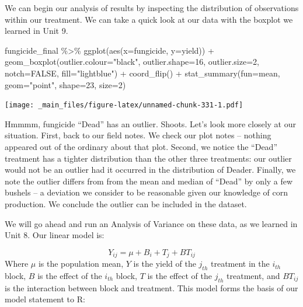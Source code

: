\documentclass[
]{book}
\newenvironment{Shaded}{\begin{snugshade}}{\end{snugshade}}
\newcommand{\AttributeTok}[1]{\textcolor[rgb]{0.77,0.63,0.00}{#1}}
\newcommand{\ConstantTok}[1]{\textcolor[rgb]{0.00,0.00,0.00}{#1}}
\newcommand{\DecValTok}[1]{\textcolor[rgb]{0.00,0.00,0.81}{#1}}
\newcommand{\FunctionTok}[1]{\textcolor[rgb]{0.00,0.00,0.00}{#1}}
\newcommand{\NormalTok}[1]{#1}
\newcommand{\SpecialCharTok}[1]{\textcolor[rgb]{0.00,0.00,0.00}{#1}}
\newcommand{\StringTok}[1]{\textcolor[rgb]{0.31,0.60,0.02}{#1}}
\begin{document}
We can begin our analysis of results by inspecting the distribution of observations within our treatment. We can take a quick look at our data with the boxplot we learned in Unit 9.

\begin{Shaded}
\begin{Highlighting}[]
\NormalTok{fungicide\_final }\SpecialCharTok{\%\textgreater{}\%}
        \FunctionTok{ggplot}\NormalTok{(}\FunctionTok{aes}\NormalTok{(}\AttributeTok{x=}\NormalTok{fungicide, }\AttributeTok{y=}\NormalTok{yield)) }\SpecialCharTok{+} 
        \FunctionTok{geom\_boxplot}\NormalTok{(}\AttributeTok{outlier.colour=}\StringTok{"black"}\NormalTok{, }\AttributeTok{outlier.shape=}\DecValTok{16}\NormalTok{,}
             \AttributeTok{outlier.size=}\DecValTok{2}\NormalTok{, }\AttributeTok{notch=}\ConstantTok{FALSE}\NormalTok{, }\AttributeTok{fill=}\StringTok{"lightblue"}\NormalTok{) }\SpecialCharTok{+}
        \FunctionTok{coord\_flip}\NormalTok{() }\SpecialCharTok{+}
        \FunctionTok{stat\_summary}\NormalTok{(}\AttributeTok{fun=}\NormalTok{mean, }\AttributeTok{geom=}\StringTok{"point"}\NormalTok{, }\AttributeTok{shape=}\DecValTok{23}\NormalTok{, }\AttributeTok{size=}\DecValTok{2}\NormalTok{)}
\end{Highlighting}
\end{Shaded}

\texttt{[image: \_main\_files/figure-latex/unnamed-chunk-331-1.pdf]}

Hmmmm, fungicide ``Dead'' has an outlier. Shoots. Let's look more closely at our situation. First, back to our field notes. We check our plot notes -- nothing appeared out of the ordinary about that plot. Second, we notice the ``Dead'' treatment has a tighter distribution than the other three treatments: our outlier would not be an outlier had it occurred in the distribution of Deader. Finally, we note the outlier differs from from the mean and median of ``Dead'' by only a few bushels -- a deviation we consider to be reasonable given our knowledge of corn production. We conclude the outlier can be included in the dataset.

We will go ahead and run an Analysis of Variance on these data, as we learned in Unit 8. Our linear model is:

\[ Y_{ij}=\mu + B_i + T_j + BT_{ij}\]
Where \(\mu\) is the population mean, \(Y\) is the yield of the \(j_{th}\) treatment in the \(i_{th}\) block, \(B\) is the effect of the \(i_{th}\) block, \(T\) is the effect of the \(j_{th}\) treatment, and \(BT_{ij}\) is the interaction between block and treatment. This model forms the basis of our model statement to R:
\end{document}
